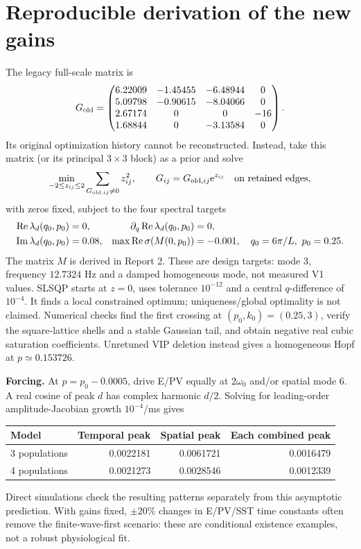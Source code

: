 \documentclass[11pt]{article}
\newcommand{\ee}{\mathrm e}
\newcommand{\Rea}{\operatorname{Re}}
\newcommand{\Ima}{\operatorname{Im}}
\begin{document}
\section{Reproducible derivation of the new gains}
The legacy full-scale matrix is
\begin{equation}
 G_{\rm old}=\begin{pmatrix}
6.22009&-1.45455&-6.48944&0\\5.09798&-0.90615&-8.04066&0\\
2.67174&0&0&-16\\1.68844&0&-3.13584&0
\end{pmatrix}.
\end{equation}
Its original optimization history cannot be reconstructed. Instead, take this
matrix (or its principal $3\times3$ block) as a prior and solve
\begin{equation}
 \min_{-2\leq z_{ij}\leq2}\sum_{G_{{\rm old},ij}\ne0}z_{ij}^2,
 \qquad G_{ij}=G_{{\rm old},ij}\ee^{z_{ij}}\quad\text{on retained edges},
 \label{eq:optimization}
\end{equation}
with zeros fixed, subject to the four spectral targets
\begin{align}
 \Rea\lambda_d(q_0,p_0)&=0,&\partial_q\Rea\lambda_d(q_0,p_0)&=0,\notag\\
 \Ima\lambda_d(q_0,p_0)&=0.08,&\max\Rea\sigma(M(0,p_0))&=-0.001,\quad
 q_0=6\pi/L,\ p_0=0.25. \label{eq:targets}
\end{align}
The matrix $M$ is derived in Report 2. These are design targets: mode 3,
frequency $12.7324$ Hz and a damped homogeneous mode, not measured V1 values.
SLSQP starts at $z=0$, uses tolerance $10^{-12}$ and a central $q$-difference
of $10^{-4}$. It finds a local constrained optimum; uniqueness/global optimality
is not claimed. Numerical checks find the first crossing at $(p_0,k_0)=(0.25,3)$,
verify the square-lattice shells and a stable Gaussian tail, and obtain
negative real cubic saturation coefficients. Unretuned VIP deletion instead
gives a homogeneous Hopf at $p\simeq0.153726$.

\textbf{Forcing.} At $p=p_0-0.0005$, drive E/PV equally at $2\omega_0$ and/or
spatial mode 6. A real cosine of peak $d$ has complex harmonic $d/2$.
Solving for leading-order amplitude-Jacobian growth $10^{-4}$/ms gives
\begin{center}\small
\begin{tabular}{lrrr}\toprule
Model&Temporal peak&Spatial peak&Each combined peak\\\midrule
3 populations&0.0022181&0.0061721&0.0016479\\
4 populations&0.0021273&0.0028546&0.0012339\\\bottomrule
\end{tabular}\end{center}
Direct simulations check the resulting patterns separately from this asymptotic
prediction. With gains fixed, $\pm20\%$ changes in E/PV/SST time constants often
remove the finite-wave-first scenario: these are conditional existence examples,
not a robust physiological fit.
\end{document}
